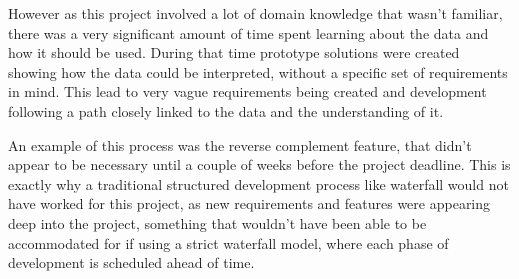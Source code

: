 However as this project involved a lot of domain knowledge that wasn't familiar, there was a very significant amount of time spent learning about the data and how it should be used. During that time prototype solutions were created showing how the data could be interpreted, without a specific set of requirements in mind. This lead to very vague requirements being created and development following a path closely linked to the data and the understanding of it. 

An example of this process was the reverse complement feature, that didn't appear to be necessary until a couple of weeks before the project deadline. This is exactly why a traditional structured development process like waterfall would not have worked for this project, as new requirements and features were appearing deep into the project, something that wouldn't have been able to be accommodated for if using a strict waterfall model, where each phase of development is scheduled ahead of time.
